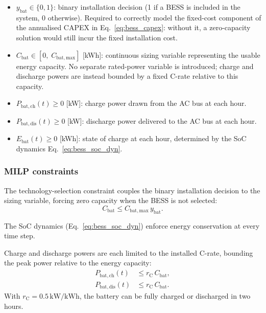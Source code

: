 \documentclass[11pt,a4paper]{report}
\begin{document}
\begin{itemize}

    \item $y_\mathrm{bat} \in \{0,1\}$: binary installation decision (1 if a BESS
          is included in the system, 0 otherwise).
          Required to correctly model the fixed-cost component of the annualised
          CAPEX in Eq.~\eqref{eq:bess_capex}: without it, a zero-capacity solution
          would still incur the fixed installation cost.

    \item $C_\mathrm{bat} \in [0,\; C_\mathrm{bat,max}]$ [kWh]: continuous sizing
          variable representing the usable energy capacity.
          No separate rated-power variable is introduced; charge and discharge
          powers are instead bounded by a fixed C-rate relative to this capacity.

    \item $P_\mathrm{bat,ch}(t) \geq 0$ [kW]: charge power drawn from the AC bus
          at each hour.

    \item $P_\mathrm{bat,dis}(t) \geq 0$ [kW]: discharge power delivered to the
          AC bus at each hour.

    \item $E_\mathrm{bat}(t) \geq 0$ [kWh]: state of charge at each hour,
          determined by the SoC dynamics Eq.~\eqref{eq:bess_soc_dyn}.

\end{itemize}

\subsubsection{MILP constraints}
\label{sub:bess_constraints}

The technology-selection constraint couples the binary installation decision to
the sizing variable, forcing zero capacity when the BESS is not selected:
\begin{equation}
    C_\mathrm{bat} \leq C_\mathrm{bat,max}\,y_\mathrm{bat}.
    \label{eq:bat_binary}
\end{equation}

The SoC dynamics (Eq.~\eqref{eq:bess_soc_dyn}) enforce energy conservation at every time step.

Charge and discharge powers are each limited to the installed C-rate, bounding
the peak power relative to the energy capacity:
\begin{align}
    P_\mathrm{bat,ch}(t)  &\leq r_\mathrm{C}\,C_\mathrm{bat}, \label{eq:bess_ch_lim} \\
    P_\mathrm{bat,dis}(t) &\leq r_\mathrm{C}\,C_\mathrm{bat}. \label{eq:bess_dis_lim}
\end{align}
With $r_\mathrm{C} = 0.5\,\mathrm{kW/kWh}$, the battery can be fully charged or
discharged in two hours.
\end{document}
